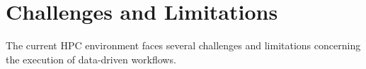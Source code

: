 \documentclass[a4paper]{article}
\begin{document}

\section{Challenges and Limitations}
\label{sec:challenges}
The current HPC environment faces several challenges and limitations concerning the execution of data-driven workflows.
\end{document}
